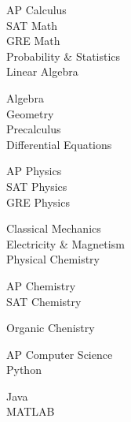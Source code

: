 \begin{minipage}[t]{0.2\textwidth}
	\flushleft
\end{minipage}
\begin{minipage}[t]{0.75\textwidth}
	{
		\begin{minipage}[t]{0.45\textwidth}	
			AP Calculus\\
			SAT Math\\
			GRE Math\\
			Probability \& Statistics\\
			Linear Algebra
		\end{minipage}
		\begin{minipage}[t]{0.45\textwidth}
			Algebra\\
			Geometry\\
			Precalculus\\
			Differential Equations
		\end{minipage}
	}
	
	\vspace*{4pt}
	{
		\begin{minipage}[t]{0.45\textwidth}
			AP Physics\\
			SAT Physics\\
			GRE Physics
		\end{minipage}
		\begin{minipage}[t]{0.45\textwidth}
			Classical Mechanics\\
			Electricity \& Magnetism\\
			Physical Chemistry
		\end{minipage}
	}
	
	\vspace*{4pt}
	{
		\begin{minipage}[t]{0.45\textwidth}
			AP Chemistry\\
			SAT Chemistry
		\end{minipage}
		\begin{minipage}[t]{0.45\textwidth}	
			Organic Chenistry
		\end{minipage}
	}

	\vspace*{4pt}
	{
		\begin{minipage}[t]{0.45\textwidth}
			AP Computer Science\\
			Python
		\end{minipage}
		\begin{minipage}[t]{0.45\textwidth}
			Java\\
			MATLAB
		\end{minipage}
	}
\end{minipage}

\vspace{8pt}

